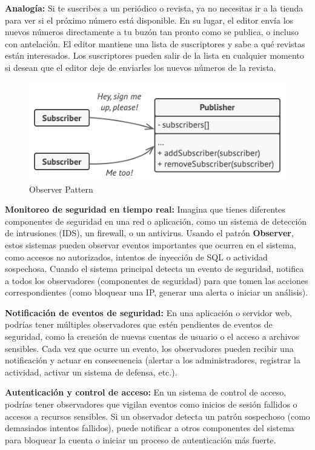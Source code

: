 \textbf{Analogía: }Si te suscribes a un periódico o revista, ya no necesitas ir a la tienda para ver si el próximo número está disponible. En su lugar, el editor envía los nuevos números directamente a tu buzón tan pronto como se publica, o incluso con antelación. El editor mantiene una lista de suscriptores y sabe a qué revistas están interesados. Los suscriptores pueden salir de la lista en cualquier momento si desean que el editor deje de enviarles los nuevos números de la revista.

\begin{figure}[H]
    \centering
    \includegraphics[width=0.5\linewidth]{PatronesSoftware/observer.png}
    \caption{Observer Pattern}
    \label{fig:observer-pattern}
\end{figure}

\textbf{Monitoreo de seguridad en tiempo real:} Imagina que tienes diferentes componentes de seguridad en una red o aplicación, como un sistema de detección de intrusiones (IDS), un firewall, o un antivirus. Usando el patrón \textbf{Observer}, estos sistemas pueden observar eventos importantes que ocurren en el sistema, como accesos no autorizados, intentos de inyección de SQL o actividad sospechosa. Cuando el sistema principal detecta un evento de seguridad, notifica a todos los observadores (componentes de seguridad) para que tomen las acciones correspondientes (como bloquear una IP, generar una alerta o iniciar un análisis). 

\textbf{Notificación de eventos de seguridad:} En una aplicación o servidor web, podrías tener múltiples observadores que estén pendientes de eventos de seguridad, como la creación de nuevas cuentas de usuario o el acceso a archivos sensibles. Cada vez que ocurre un evento, los observadores pueden recibir una notificación y actuar en consecuencia (alertar a los administradores, registrar la actividad, activar un sistema de defensa, etc.).

\textbf{Autenticación y control de acceso: }En un sistema de control de acceso, podrías tener observadores que vigilan eventos como inicios de sesión fallidos o accesos a recursos sensibles. Si un observador detecta un patrón sospechoso (como demasiados intentos fallidos), puede notificar a otros componentes del sistema para bloquear la cuenta o iniciar un proceso de autenticación más fuerte.

